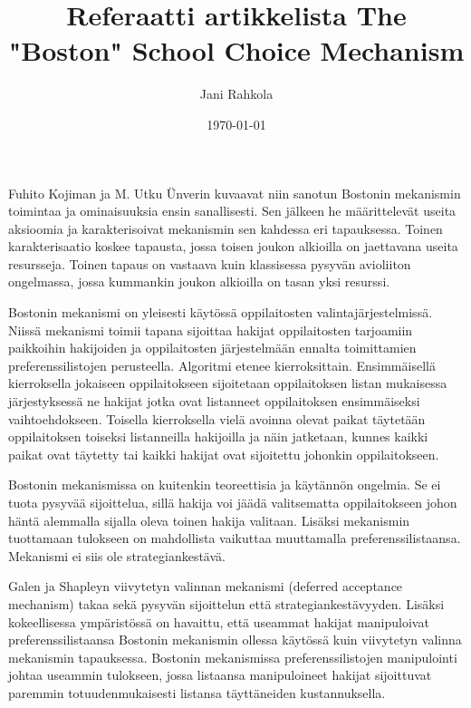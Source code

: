 \documentclass[gradu]{tktltiki}
\begin{document}
\title{Referaatti artikkelista The "Boston" School Choice Mechanism}
\author{Jani Rahkola}
\date{\today}

\maketitle

\doublespacing

\subject{Tietojenkäsittelytiede}


Fuhito Kojiman ja M. Utku Ünverin kuvaavat niin sanotun Bostonin
mekanismin toimintaa ja ominaisuuksia ensin sanallisesti. Sen jälkeen
he määrittelevät useita aksioomia ja karakterisoivat mekanismin sen
kahdessa eri tapauksessa. Toinen karakterisaatio koskee tapausta,
jossa toisen joukon alkioilla on jaettavana useita resursseja. Toinen
tapaus on vastaava kuin klassisessa pysyvän avioliiton ongelmassa,
jossa kummankin joukon alkioilla on tasan yksi resurssi.

Bostonin mekanismi on yleisesti käytössä oppilaitosten
valintajärjestelmissä. Niissä mekanismi toimii tapana sijoittaa
hakijat oppilaitosten tarjoamiin paikkoihin hakijoiden ja
oppilaitosten järjestelmään ennalta toimittamien preferenssilistojen
perusteella. Algoritmi etenee kierroksittain. Ensimmäisellä
kierroksella jokaiseen oppilaitokseen sijoitetaan oppilaitoksen listan
mukaisessa järjestyksessä ne hakijat jotka ovat listanneet
oppilaitoksen ensimmäiseksi vaihtoehdokseen. Toisella kierroksella
vielä avoinna olevat paikat täytetään oppilaitoksen toiseksi
listanneilla hakijoilla ja näin jatketaan, kunnes kaikki paikat ovat
täytetty tai kaikki hakijat ovat sijoitettu johonkin oppilaitokseen.

Bostonin mekanismissa on kuitenkin teoreettisia ja käytännön ongelmia.
Se ei tuota pysyvää sijoittelua, sillä hakija voi jäädä valitsematta
oppilaitokseen johon häntä alemmalla sijalla oleva toinen hakija
valitaan. Lisäksi mekanismin tuottamaan tulokseen on mahdollista
vaikuttaa muuttamalla preferenssilistaansa. Mekanismi ei siis ole
strategiankestävä.

Galen ja Shapleyn viivytetyn valinnan mekanismi (deferred acceptance
mechanism) takaa sekä pysyvän sijoittelun että strategiankestävyyden.
Lisäksi kokeellisessa ympäristössä on havaittu, että useammat hakijat
manipuloivat preferenssilistaansa Bostonin mekanismin ollessa käytössä
kuin viivytetyn valinna mekanismin tapauksessa. Bostonin mekanismissa
preferenssilistojen manipulointi johtaa useammin tulokseen, jossa
listaansa manipuloineet hakijat sijoittuvat paremmin
totuudenmukaisesti listansa täyttäneiden kustannuksella.
\end{document}

